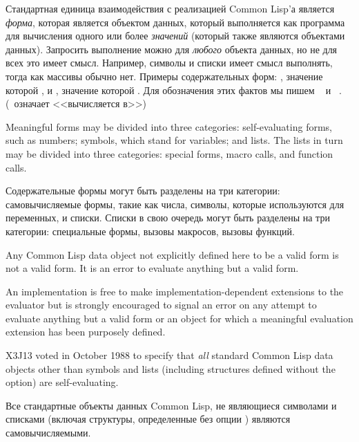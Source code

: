 Стандартная единица взаимодействия с реализацией Common Lisp'а является
\textit{форма}, которая является объектом данных, который выполняется как
программа для вычисления одного или более \textit{значений} (который также
являются объектами данных). Запросить выполнение можно для \textit{любого}
объекта данных, но не для всех это имеет смысл. Например, символы и списки имеет
смысл выполнять, тогда как массивы обычно нет. Примеры содержательных форм:
, значение которой , и , значение которой .
Для обозначения этих фактов мы пишем  \EV\  и  \EV\
. (\EV\ означает <<вычисляется в>>)

Meaningful forms may be divided into three categories:
self-evaluating forms, such as numbers; symbols, which stand
for variables; and lists.  The lists in turn may be divided
into three categories: special forms, macro calls, and function calls.

Содержательные формы могут быть разделены на три категории:
самовычисляемые формы, такие как числа,
символы, которые используются для переменных,
и списки. Списки в свою очередь могут быть разделены на три категории:
специальные формы, 
вызовы макросов,
вызовы функций.

\begin{obsolete}
Any Common Lisp data object not explicitly defined here to be a valid form
is not a valid form.  It is an error to evaluate
anything but a valid form.

\beforenoterule
\begin{implementation}
An implementation is free to make
implementation-dependent extensions to the evaluator but is
strongly encouraged to signal an error on any attempt to
evaluate anything but a valid form or an object for which
a meaningful evaluation extension has been purposely defined.
\end{implementation}
\afternoterule
\end{obsolete}

\begin{newer}
X3J13 voted in October 1988  to specify that
\textit{all} standard Common Lisp data objects other than symbols
and lists (including \cd{defstruct} structures defined
without the  option) are self-evaluating.

Все стандартные объекты данных Common Lisp, не являющиеся символами и списками
(включая \cd{defstruct} структуры, определенные без опции \cd{:type}) являются
самовычисляемыми. 
\end{newer}

